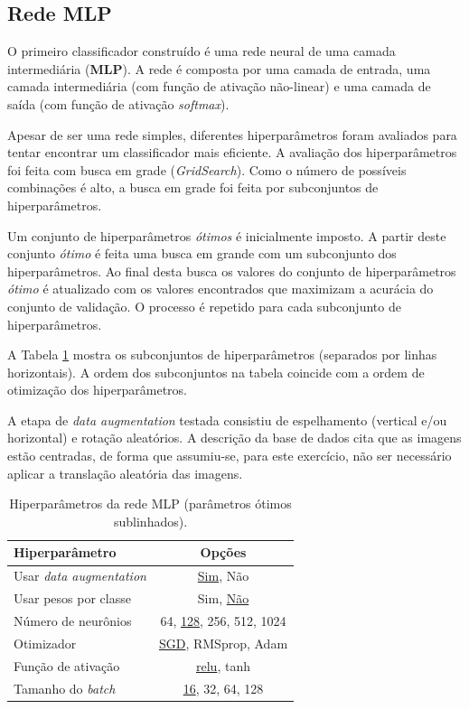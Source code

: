 \documentclass[final,5p]{elsarticle}
\numberwithin{equation}{section}
\begin{document}
    \subsection{Rede MLP}

    O primeiro classificador construído é uma rede neural de uma camada intermediária (\textbf{MLP}). A rede é composta por uma camada de entrada, uma camada intermediária (com função de ativação não-linear) e uma camada de saída (com função de ativação \emph{softmax}).

    Apesar de ser uma rede simples, diferentes hiperparâmetros foram avaliados para tentar encontrar um classificador mais eficiente. A avaliação dos hiperparâmetros foi feita com busca em grade (\emph{GridSearch}). Como o número de possíveis combinações é alto, a busca em grade foi feita por subconjuntos de hiperparâmetros.

    Um conjunto de hiperparâmetros \emph{ótimos} é inicialmente imposto. A partir deste conjunto \emph{ótimo} é feita uma busca em grande com um subconjunto dos hiperparâmetros. Ao final desta busca os valores do conjunto de hiperparâmetros \emph{ótimo} é atualizado com os valores encontrados que maximizam a acurácia do conjunto de validação. O processo é repetido para cada subconjunto de hiperparâmetros.

    A Tabela \ref{tab:ParametrosMLP} mostra os subconjuntos de hiperparâmetros (separados por linhas horizontais). A ordem dos subconjuntos na tabela coincide com a ordem de otimização dos hiperparâmetros.

    A etapa de \emph{data augmentation} testada consistiu de espelhamento (vertical e/ou horizontal) e rotação aleatórios. A descrição da base de dados cita que as imagens estão centradas, de forma que assumiu-se, para este exercício, não ser necessário aplicar a translação aleatória das imagens.

    \begin{table}[h]
        \centering
        \begin{tabular}{l c}
            \toprule
            \textbf{Hiperparâmetro} & \textbf{Opções} \\
            \midrule
            Usar \emph{data augmentation} & \underline{Sim}, Não \\
            Usar pesos por classe & Sim, \underline{Não} \\
            \midrule
            Número de neurônios & 64, \underline{128}, 256, 512, 1024 \\
            \midrule
            Otimizador & \underline{SGD}, RMSprop, Adam \\
            Função de ativação & \underline{relu}, tanh \\
            Tamanho do \emph{batch} & \underline{16}, 32, 64, 128 \\
            \bottomrule
        \end{tabular}
        \caption{Hiperparâmetros da rede MLP (parâmetros ótimos sublinhados).}\label{tab:ParametrosMLP}
    \end{table}
\end{document}
